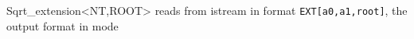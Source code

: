 \begin{ccRefClass}{Sqrt_extension<NT,ROOT>}
{reads  from istream  in format {\tt EXT[a0,a1,root]}, the output format in mode  }



\end{ccRefClass}
